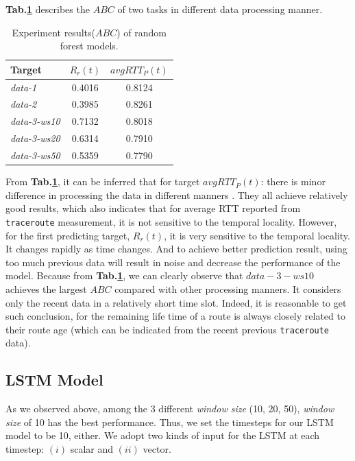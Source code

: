 \documentclass[sigconf]{acmart}
\begin{document}
	\textbf{Tab.\ref{tab:result_RF}} describes the $ABC$ of two tasks in different data processing manner.
	\begin{table}[tbp]
		\centering  
		\begin{tabular}{lcc} 
			\hline
			Target &$R_r(t)$ &$avgRTT_P(t)$ \\ \hline
			\textit{data-1} & 0.4016    &0.8124   \\        
			\textit{data-2} &0.3985 &0.8261 \\        
			\textit{data-3-ws10}  &0.7132 &0.8018 \\
			\textit{data-3-ws20} &0.6314 &0.7910 \\
			\textit{data-3-ws50} &0.5359  &0.7790 \\ \hline
		\end{tabular}
		\caption{Experiment results($ABC$) of random forest models. }
		\label{tab:result_RF}
	\end{table}
	From \textbf{Tab.\ref{tab:result_RF}}, it can be inferred that for target $avgRTT_P(t)$: there is minor difference in processing the data in different manners . They all achieve relatively good results, which also indicates that for average RTT reported from \texttt{traceroute} measurement, it is not sensitive to the temporal locality. However, for the first predicting target, $R_r(t)$, it is very sensitive to the temporal locality. It changes rapidly as time changes. And to achieve better prediction result, using too much previous data will result in noise and decrease the performance of the model. Because from \textbf{Tab.\ref{tab:result_RF}}, we can clearly observe that $data-3-ws10$ achieves the largest $ABC$ compared with other processing manners. It considers only the recent data in a relatively short time slot. Indeed, it is reasonable to get such conclusion, for the remaining life time of a route is always closely related to their route age (which can be indicated from the recent previous \texttt{traceroute} data).
	\subsection{LSTM Model}
	
	As we observed above, among the 3 different \textit{window size} (10, 20, 50), \textit{window size} of 10 has the best performance. Thus, we set the timesteps for our LSTM model to be 10, either.  We adopt two kinds of input for the LSTM at each timestep: $(i)$ scalar and $(ii)$ vector.
	
\end{document}
